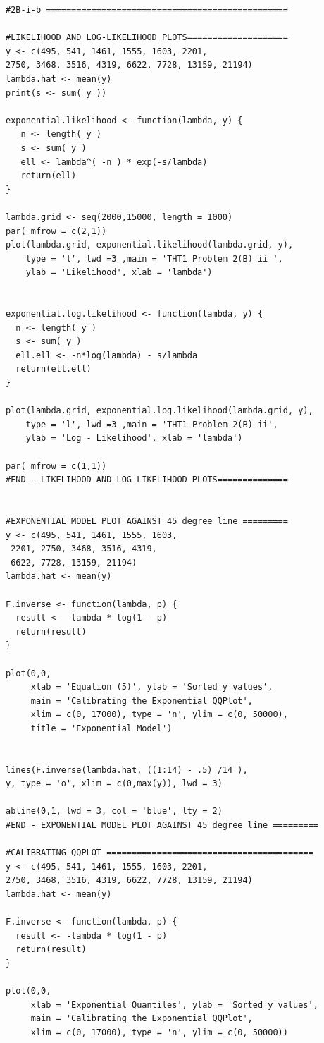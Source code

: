 \documentclass[12pt]{article}
\begin{document}
\begin{lstlisting}
#2B-i-b ================================================

#LIKELIHOOD AND LOG-LIKELIHOOD PLOTS====================
y <- c(495, 541, 1461, 1555, 1603, 2201, 
2750, 3468, 3516, 4319, 6622, 7728, 13159, 21194)
lambda.hat <- mean(y)
print(s <- sum( y ))

exponential.likelihood <- function(lambda, y) {
   n <- length( y )
   s <- sum( y )
   ell <- lambda^( -n ) * exp(-s/lambda)
   return(ell)
}

lambda.grid <- seq(2000,15000, length = 1000)
par( mfrow = c(2,1))
plot(lambda.grid, exponential.likelihood(lambda.grid, y), 
    type = 'l', lwd =3 ,main = 'THT1 Problem 2(B) ii ', 
    ylab = 'Likelihood', xlab = 'lambda')


exponential.log.likelihood <- function(lambda, y) {
  n <- length( y )
  s <- sum( y )
  ell.ell <- -n*log(lambda) - s/lambda
  return(ell.ell)
}

plot(lambda.grid, exponential.log.likelihood(lambda.grid, y), 
    type = 'l', lwd =3 ,main = 'THT1 Problem 2(B) ii', 
    ylab = 'Log - Likelihood', xlab = 'lambda')

par( mfrow = c(1,1))
#END - LIKELIHOOD AND LOG-LIKELIHOOD PLOTS==============


#EXPONENTIAL MODEL PLOT AGAINST 45 degree line =========
y <- c(495, 541, 1461, 1555, 1603,
 2201, 2750, 3468, 3516, 4319, 
 6622, 7728, 13159, 21194)
lambda.hat <- mean(y)

F.inverse <- function(lambda, p) {
  result <- -lambda * log(1 - p)
  return(result)
}

plot(0,0,
     xlab = 'Equation (5)', ylab = 'Sorted y values',
     main = 'Calibrating the Exponential QQPlot',
     xlim = c(0, 17000), type = 'n', ylim = c(0, 50000),
     title = 'Exponential Model')


lines(F.inverse(lambda.hat, ((1:14) - .5) /14 ), 
y, type = 'o', xlim = c(0,max(y)), lwd = 3)

abline(0,1, lwd = 3, col = 'blue', lty = 2)    
#END - EXPONENTIAL MODEL PLOT AGAINST 45 degree line =========

#CALIBRATING QQPLOT =========================================
y <- c(495, 541, 1461, 1555, 1603, 2201, 
2750, 3468, 3516, 4319, 6622, 7728, 13159, 21194)
lambda.hat <- mean(y)

F.inverse <- function(lambda, p) {
  result <- -lambda * log(1 - p)
  return(result)
}

plot(0,0,
     xlab = 'Exponential Quantiles', ylab = 'Sorted y values',
     main = 'Calibrating the Exponential QQPlot',
     xlim = c(0, 17000), type = 'n', ylim = c(0, 50000))


\end{lstlisting}
\end{document}
